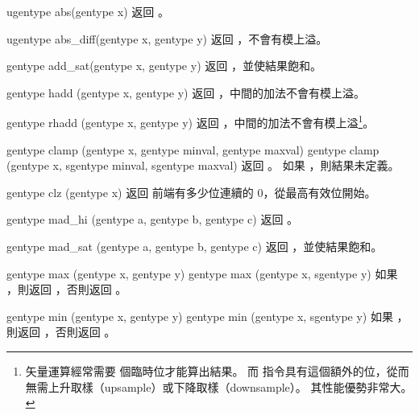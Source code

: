 ugentype abs(gentype x)
\stopbuffer
{}
返回 。
\stopbuffer

ugentype abs_diff(gentype x,
		gentype y)
\stopbuffer
{}
返回 ，不會有模上溢。
\stopbuffer

gentype add_sat(gentype x,
		gentype y)
\stopbuffer
{}
返回 ，並使結果飽和。
\stopbuffer

gentype hadd (gentype x,
		gentype y)
\stopbuffer
{}
返回 ，中間的加法不會有模上溢。
\stopbuffer

gentype rhadd (gentype x,
		gentype y)
\stopbuffer
{}
返回 ，中間的加法不會有模上溢\footnote{
矢量運算經常需要  個臨時位才能算出結果。
而  指令具有這個額外的位，從而無需上升取樣（upsample）或下降取樣（downsample）。
其性能優勢非常大。}。
\stopbuffer

gentype clamp (gentype x,
		gentype minval,
		gentype maxval)
gentype clamp (gentype x,
		sgentype minval,
		sgentype maxval)
\stopbuffer
{}
返回 。
如果 ，則結果未定義。
\stopbuffer

gentype clz (gentype x)
\stopbuffer
{}
返回  前端有多少位連續的 0，從最高有效位開始。
\stopbuffer

gentype mad_hi (gentype a,
		gentype b,
		gentype c)
\stopbuffer
{}
返回 。
\stopbuffer

gentype mad_sat (gentype a,
		gentype b,
		gentype c)
\stopbuffer
{}
返回 ，並使結果飽和。
\stopbuffer

gentype max (gentype x, gentype y)
gentype max (gentype x, sgentype y)
\stopbuffer
{}
如果 ，則返回 ，否則返回 。
\stopbuffer

gentype min (gentype x, gentype y)
gentype min (gentype x, sgentype y)
\stopbuffer
{}
如果 ，則返回 ，否則返回 。
\stopbuffer

